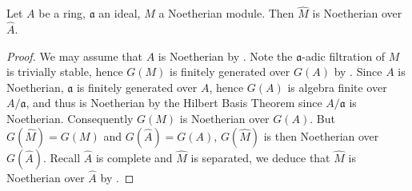 \documentclass[10pt]{extarticle}
\begin{document}
\begin{theorem}{}{}
    Let $A$ be a ring, $\mathfrak{a}$ an ideal, $M$ a Noetherian module. Then $\widehat{M}$ is Noetherian over $\widehat{A}$.
\end{theorem}
\begin{proof}
    We may assume that $A$ is Noetherian by . Note the $\mathfrak{a}$-adic filtration of $M$ is trivially stable, hence $G(M)$ is finitely generated over $G(A)$ by . Since $A$ is Noetherian, $\mathfrak{a}$ is finitely generated over $A$, hence $G(A)$ is algebra finite over $A/\mathfrak{a}$, and thus is Noetherian by the Hilbert Basis Theorem since $A/\mathfrak{a}$ is Noetherian. Consequently $G(M)$ is Noetherian over $G(A)$. But $G\left(\widehat{M}\right)=G(M)$ and $G\left(\widehat{A}\right)=G(A)$, $G\left(\widehat{M}\right)$ is then Noetherian over $G\left(\widehat{A}\right)$. Recall $\widehat{A}$ is complete and $\widehat{M}$ is separated, we deduce that $\widehat{M}$ is Noetherian over $\widehat{A}$ by .
\end{proof}





\newpage
{} %
\printbibliography %
\end{document}
